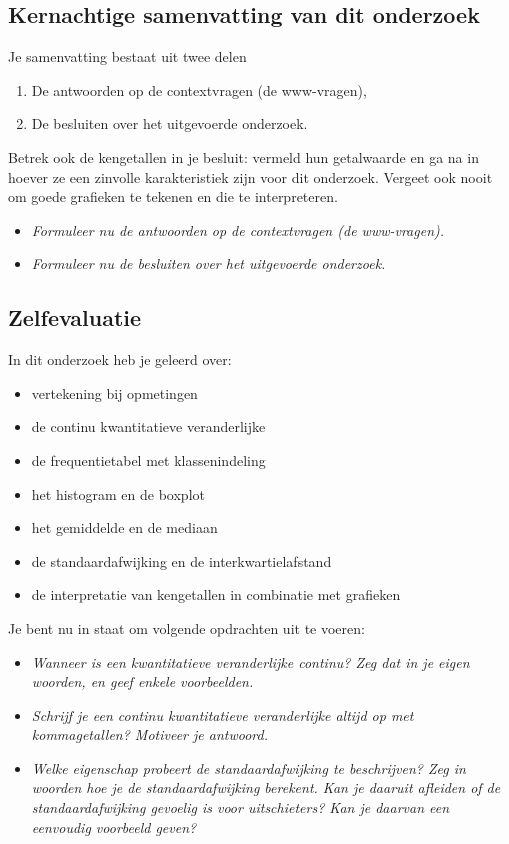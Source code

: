 \documentclass[11pt]{article}
\newcommand{\vraag}[2]{\begin{itemize}\item {\it #1} \vspace*{#2}\end{itemize}}
\begin{document}
\subsection{Kernachtige samenvatting van dit onderzoek}

Je samenvatting bestaat uit twee delen
\begin{enumerate}
  \item De antwoorden op de contextvragen (de www-vragen),
  \item De besluiten over het uitgevoerde onderzoek.
\end{enumerate}

Betrek ook de kengetallen in je besluit: vermeld hun getalwaarde en ga na in hoever ze een zinvolle
karakteristiek zijn voor dit onderzoek. Vergeet ook nooit om goede grafieken te tekenen en die te
interpreteren.

\vraag{Formuleer nu de antwoorden op de contextvragen (de www-vragen).}{6cm}

\vraag{Formuleer nu de besluiten over het uitgevoerde onderzoek.}{6cm}

\subsection{Zelfevaluatie}

In dit onderzoek heb je geleerd over:
\begin{itemize}
  \item vertekening bij opmetingen
  \item de continu kwantitatieve veranderlijke
  \item de frequentietabel met klassenindeling
  \item het histogram en de boxplot
  \item het gemiddelde en de mediaan
  \item de standaardafwijking en de interkwartielafstand
  \item de interpretatie van kengetallen in combinatie met grafieken
\end{itemize}

Je bent nu in staat om volgende opdrachten uit te voeren:
\vraag{Wanneer is een kwantitatieve veranderlijke continu? Zeg dat in je eigen woorden, en geef
enkele voorbeelden.}{4cm}

\vraag{Schrijf je een continu kwantitatieve veranderlijke altijd op met kommagetallen? Motiveer je
antwoord.}{4cm}

\vraag{Welke eigenschap probeert de standaardafwijking te beschrijven? Zeg in woorden hoe je de
standaardafwijking berekent. Kan je daaruit afleiden of de standaardafwijking gevoelig is
voor uitschieters? Kan je daarvan een eenvoudig voorbeeld geven?}{8cm}
\end{document}
